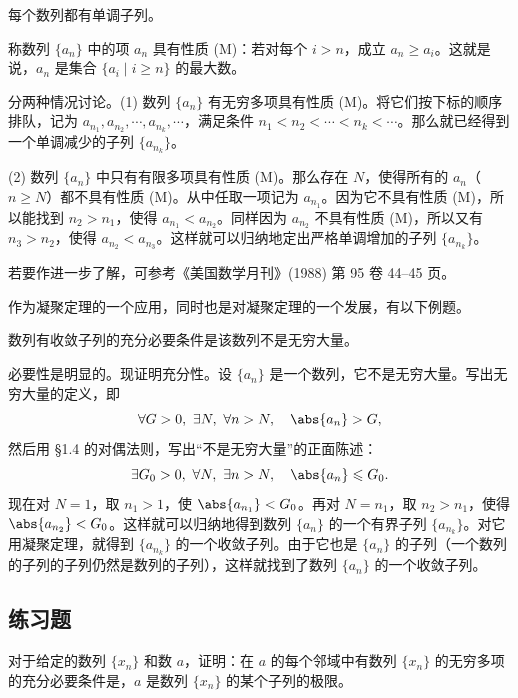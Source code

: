 \begin{xexample}[3.3.1]
每个数列都有单调子列。
\end{xexample}
\begin{xproof}
称数列 $\{a_n\}$ 中的项 $a_n$ 具有性质 (M)：若对每个 $i>n$，成立 $a_n\geqslant a_i$。这就是说，$a_n$ 是集合 $\{a_i\mid i\geqslant n\}$ 的最大数。

分两种情况讨论。(1) 数列 $\{a_n\}$ 有无穷多项具有性质 (M)。将它们按下标的顺序排队，记为 $a_{n_1},a_{n_2},\cdots,a_{n_k},\cdots$，满足条件 $n_1<n_2<\cdots<n_k<\cdots$。那么就已经得到一个单调减少的子列 $\{a_{n_k}\}$。

(2) 数列 $\{a_n\}$ 中只有有限多项具有性质 (M)。那么存在 $N$，使得所有的 $a_n$（$n\geqslant N$）都不具有性质 (M)。从中任取一项记为 $a_{n_1}$。因为它不具有性质 (M)，所以能找到 $n_2>n_1$，使得 $a_{n_1}<a_{n_2}$。同样因为 $a_{n_2}$ 不具有性质 (M)，所以又有 $n_3>n_2$，使得 $a_{n_2}<a_{n_3}$。这样就可以归纳地定出严格单调增加的子列 $\{a_{n_k}\}$。
\end{xproof}

\begin{xremark}
若要作进一步了解，可参考《美国数学月刊》(1988) 第 95 卷 44--45 页。
\end{xremark}

作为凝聚定理的一个应用，同时也是对凝聚定理的一个发展，有以下例题。

\begin{xexample}[3.3.2]
数列有收敛子列的充分必要条件是该数列不是无穷大量。
\end{xexample}
\begin{xproof}
必要性是明显的。现证明充分性。设 $\{a_n\}$ 是一个数列，它不是无穷大量。写出无穷大量的定义，即
\[
  \forall G>0,\ \exists N,\ \forall n>N,\quad \abs{a_n}>G,
\]
然后用 §1.4 的对偶法则，写出“不是无穷大量”的正面陈述：
\[
  \exists G_0>0,\ \forall N,\ \exists n>N,\quad \abs{a_n}\leqslant G_0.
\]
现在对 $N=1$，取 $n_1>1$，使 $\abs{a_{n_1}}<G_0$。再对 $N=n_1$，取 $n_2>n_1$，使得 $\abs{a_{n_2}}<G_0$。这样就可以归纳地得到数列 $\{a_n\}$ 的一个有界子列 $\{a_{n_k}\}$。对它用凝聚定理，就得到 $\{a_{n_k}\}$ 的一个收敛子列。由于它也是 $\{a_n\}$ 的子列（一个数列的子列的子列仍然是数列的子列），这样就找到了数列 $\{a_n\}$ 的一个收敛子列。
\end{xproof}

\subsection{练习题}

\begin{xexercise}[1]
对于给定的数列 $\{x_n\}$ 和数 $a$，证明：在 $a$ 的每个邻域中有数列 $\{x_n\}$ 的无穷多项的充分必要条件是，$a$ 是数列 $\{x_n\}$ 的某个子列的极限。
\end{xexercise}

